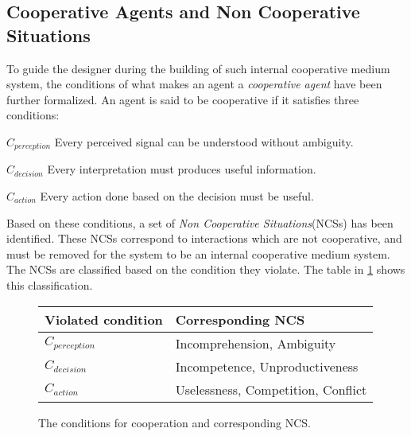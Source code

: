 \subsection{Cooperative Agents and Non Cooperative Situations}

To guide the designer during the building of such internal cooperative medium system, the conditions of what makes an agent a \emph{cooperative agent} have been further formalized. An agent is said to be cooperative if it satisfies three conditions:
\begin{compactitem}
\item $C_{perception}$ Every perceived signal can be understood without ambiguity.
\item $C_{decision}$ Every interpretation must produces useful information.
\item $C_{action}$ Every action done based on the decision must be useful.
\end{compactitem}

Based on these conditions, a set of \emph{Non Cooperative Situations}(NCSs) has been identified. These NCSs correspond to interactions which are not cooperative, and must be removed for the system to be an internal cooperative medium system. The NCSs are classified based on the condition they violate. The table in \figurename{} \ref{NCS} shows this classification.

\begin{figure}
\centering
\begin{tabular}{ll}
\toprule
\textbf{Violated condition}	& \textbf{Corresponding NCS} \\
\midrule
$C_{perception}$ & Incomprehension, Ambiguity\\

$C_{decision}$ & Incompetence, Unproductiveness \\

$C_{action}$ & Uselessness, Competition, Conflict\\
\bottomrule
\end{tabular}
\caption{The conditions for cooperation and corresponding NCS.}
\label{NCS}
\end{figure}

